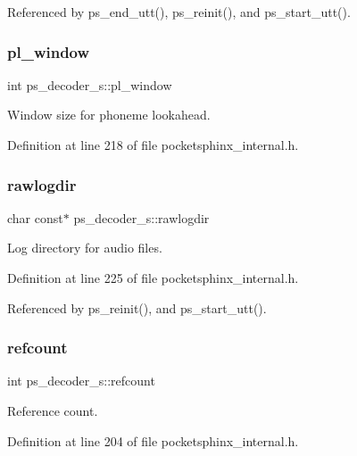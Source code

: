 Referenced by ps\+\_\+end\+\_\+utt(), ps\+\_\+reinit(), and ps\+\_\+start\+\_\+utt().

\mbox{\label{structps__decoder__s_a0f0a6681ffd98af789f6bed556c814e4}} 
\subsubsection{pl\+\_\+window}
{\footnotesize\ttfamily int ps\+\_\+decoder\+\_\+s\+::pl\+\_\+window}



Window size for phoneme lookahead. 



Definition at line 218 of file pocketsphinx\+\_\+internal.\+h.

\mbox{\label{structps__decoder__s_aa2610c52a9267ee18ca095169bf34bfd}} 
\subsubsection{rawlogdir}
{\footnotesize\ttfamily char const$\ast$ ps\+\_\+decoder\+\_\+s\+::rawlogdir}



Log directory for audio files. 



Definition at line 225 of file pocketsphinx\+\_\+internal.\+h.



Referenced by ps\+\_\+reinit(), and ps\+\_\+start\+\_\+utt().

\mbox{\label{structps__decoder__s_aa5ab90180288b6c9039eb86b496f76aa}} 
\subsubsection{refcount}
{\footnotesize\ttfamily int ps\+\_\+decoder\+\_\+s\+::refcount}



Reference count. 



Definition at line 204 of file pocketsphinx\+\_\+internal.\+h.



